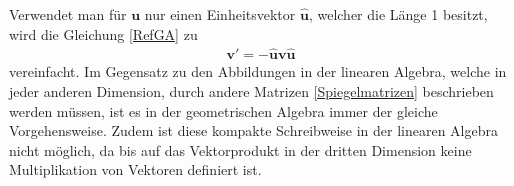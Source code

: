 Verwendet man für $\mathbf{u}$ nur einen Einheitsvektor $\mathbf{\hat{u}}$, welcher die Länge 1 besitzt, wird die Gleichung \eqref{RefGA} zu
\begin{align}
	\mathbf{v'} = -\mathbf{\hat{u}v\hat{u}}
\end{align}
vereinfacht. Im Gegensatz zu den Abbildungen in der linearen Algebra, welche in jeder anderen Dimension, durch andere Matrizen \eqref{Spiegelmatrizen} beschrieben werden müssen, ist es in der geometrischen Algebra immer der gleiche Vorgehensweise. Zudem ist diese kompakte Schreibweise in der linearen Algebra nicht möglich, da bis auf das Vektorprodukt in der dritten Dimension keine Multiplikation von Vektoren definiert ist. 